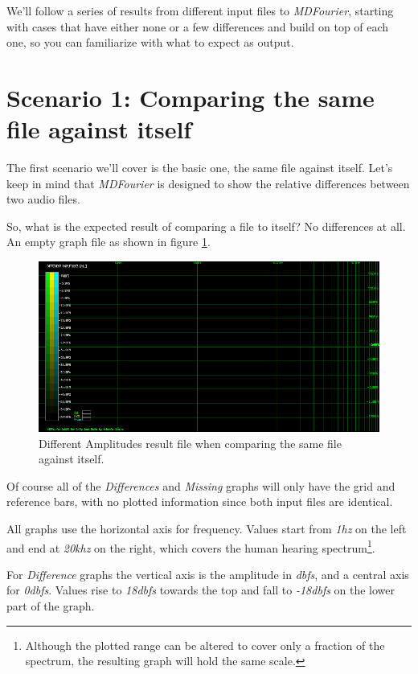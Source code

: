 \documentclass[10pt,a4paper]{report}
\newcommand{\ac}[1]{\textit{\acrshort{#1}}}
\newcommand{\hz}[1]{\textit{#1\acrshort{hz}}}
\newcommand{\khz}[1]{\textit{#1\acrshort{khz}}}
\newcommand{\db}[1]{\textit{#1\acrshort{dbfs}}}
\begin{document}
We'll follow a series of results from different input files to \textit{MDFourier}, starting with cases that have either none or a few differences and build on top of each one, so you can familiarize with what to expect as output.

\section{Scenario 1: Comparing the same file against itself}
\label{scenario1}

The first scenario we'll cover is the basic one, the same file against itself. Let's keep in mind that \textit{MDFourier} is designed to show the relative differences between two audio files.

So, what is the expected result of comparing a file to itself? No differences at all. An empty graph file as shown in figure \ref{fig:plot1-samefile}.

\begin{figure}[H]
	\centering
	\includegraphics[width=1.0\linewidth]{images/interpretation/Plot1-SameFile.png}
	\caption[Same file compared]{Different Amplitudes result file when comparing the same file against itself.}
	\label{fig:plot1-samefile}
\end{figure}

Of course all of the \textit{Differences} and \textit{Missing} graphs will only have the grid and reference bars, with no plotted information since both input files are identical.

All graphs use the horizontal axis for frequency. Values start from \hz{1} on the left and end at  \khz{20} on the right, which covers the human hearing spectrum\footnote{Although the plotted range can be altered to cover only a fraction of the spectrum, the resulting graph will hold the same scale.}.

For \textit{Difference} graphs the vertical axis is the amplitude in \ac{dbfs}, and a central axis for \db{0}. Values rise to \db{18} towards the top and fall to \db{-18} on the lower part of the graph.
\end{document}
